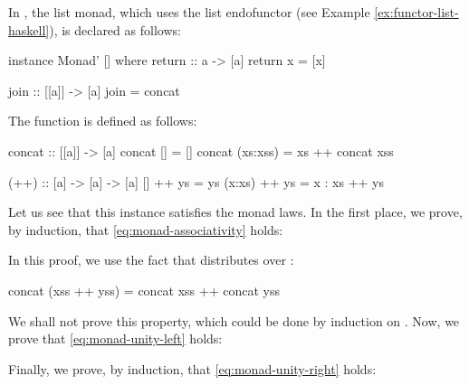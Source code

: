 \begin{example}
  \label{ex:monad-list-haskell}

  In \hask, the list monad, which uses the list endofunctor (see
  Example \ref{ex:functor-list-haskell}), is declared as follows:
  \begin{codehaskell}
instance Monad' [] where
  return :: a -> [a]
  return x = [x]

  join :: [[a]] -> [a]
  join = concat
  \end{codehaskell}
  The  function is defined as follows:
  \begin{codehaskell}
concat :: [[a]] -> [a]
concat []       = []
concat (xs:xss) = xs ++ concat xss

(++) :: [a] -> [a] -> [a]
[]     ++ ys = ys
(x:xs) ++ ys = x : xs ++ ys
  \end{codehaskell}
  Let us see that this instance satisfies the monad laws. In the first
  place, we prove, by induction, that \eqref{eq:monad-associativity}
  holds:

  \vspace{1em}
  \caseh{[]}
  \begin{steps}
  \end{steps}
  \begin{steps}
      \eqbyih
  \end{steps}
  In this proof, we use the fact that  distributes
  over \texthaskell{(++)}:
  \begin{codehaskell}
concat (xss ++ yss) = concat xss ++ concat yss
  \end{codehaskell}
  We shall not prove this property, which could be done by induction
  on . Now, we prove that \eqref{eq:monad-unity-left}
  holds:
  \begin{steps}
  \end{steps}
  Finally, we prove, by induction, that \eqref{eq:monad-unity-right}
  holds:


\end{example}
